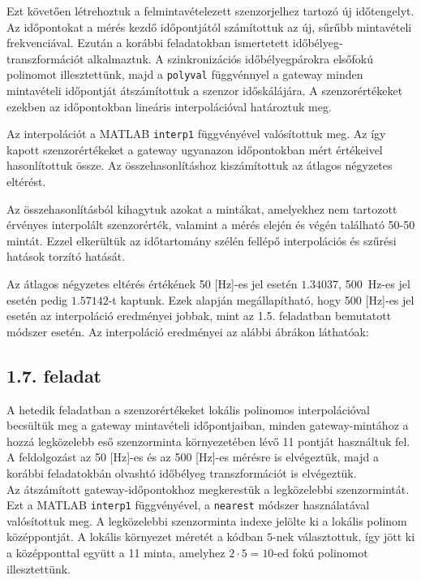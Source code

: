 \documentclass[12pt,a4paper]{article}
\newcommand{\feladat}[1]{%
\phantomsection
\subsection*{#1. feladat}%
\addcontentsline{toc}{subsection}{#1. feladat}%
}
\begin{document}
Ezt követően létrehoztuk a felmintavételezett szenzorjelhez tartozó új
időtengelyt. Az időpontokat a mérés kezdő időpontjától számítottuk az új,
sűrűbb mintavételi frekvenciával. Ezután a korábbi feladatokban ismertetett
időbélyeg-transzformációt alkalmaztuk. A szinkronizációs időbélyegpárokra
elsőfokú polinomot illesztettünk, majd a \texttt{polyval} függvénnyel a gateway minden mintavételi időpontját átszámítottuk a szenzor időskálájára. A szenzorértékeket ezekben az időpontokban lineáris interpolációval
határoztuk meg. 

Az interpolációt a MATLAB \texttt{interp1} függvényével valósítottuk meg.
Az így kapott szenzorértékeket a gateway ugyanazon időpontokban mért
értékeivel hasonlítottuk össze. Az összehasonlításhoz kiszámítottuk az
átlagos négyzetes eltérést.

Az összehasonlításból kihagytuk azokat a mintákat, amelyekhez nem tartozott
érvényes interpolált szenzorérték, valamint a mérés elején és végén
található 50-50 mintát. Ezzel elkerültük az időtartomány szélén fellépő
interpolációs és szűrési hatások torzító hatását.

Az átlagos négyzetes eltérés értékének 50 [Hz]-es jel esetén $1.34037$, 500~Hz-es jel esetén pedig $1.57142$-t kaptunk. Ezek alapján megállapítható, hogy 500 [Hz]-es jel esetén az interpoláció eredményei jobbak, mint az 1.5. feladatban bemutatott módszer esetén. Az interpoláció eredményei az alábbi ábrákon láthatóak:



\newpage
\feladat{1.7}
A hetedik feladatban a szenzorértékeket lokális polinomos interpolációval
becsültük meg a gateway mintavételi időpontjaiban, minden gateway-mintához a
hozzá legközelebb eső szenzorminta környezetében lévő 11 pontját használtuk fel.
A feldolgozást az 50 [Hz]-es és az 500 [Hz]-es mérésre is elvégeztük, majd a korábbi feladatokbán olvashtó időbélyeg transzformációt is elvégeztük.\\

Az átszámított gateway-időpontokhoz megkerestük a legközelebbi
szenzormintát. Ezt a MATLAB \texttt{interp1} függvényével, a
\texttt{nearest} módszer használatával valósítottuk meg. A legközelebbi
szenzorminta indexe jelölte ki a lokális polinom középpontját. A lokális környezet méretét a kódban $5$-nek választottuk, így jött ki a középponttal együtt a 11 minta, amelyhez $2\cdot5 = 10$-ed fokú polinomot illesztettünk.\\
\end{document}
